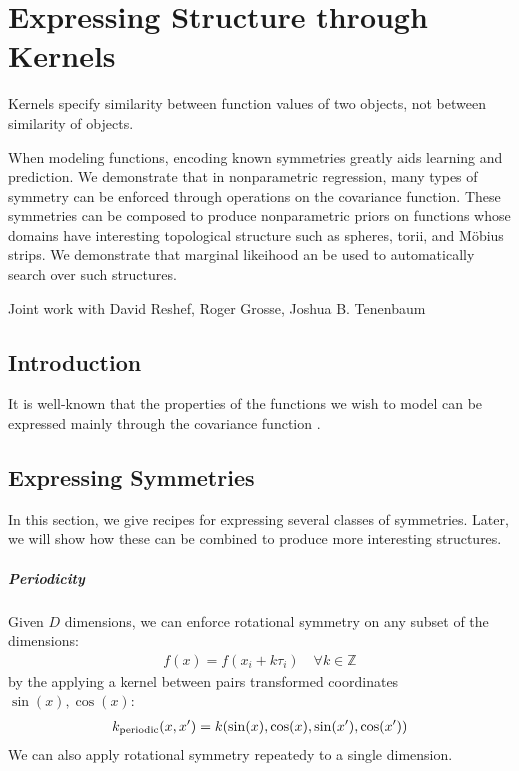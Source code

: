 
\inbpdocument

\chapter{Expressing Structure through Kernels}
\label{ch:kernels}


Kernels specify similarity between function values of two objects, not between similarity of objects.



When modeling functions, encoding known symmetries greatly aids learning and prediction.  We demonstrate that in nonparametric regression, many types of symmetry can be enforced through operations on the covariance function.  These symmetries can be composed to produce nonparametric priors on functions whose domains have interesting topological structure such as spheres, torii, and M\"{o}bius strips.  We demonstrate that marginal likeihood an be used to automatically search over such structures.

Joint work with David Reshef, Roger Grosse, Joshua B. Tenenbaum

\section{Introduction}


It is well-known that the properties of the functions we wish to model can be expressed mainly through the covariance function \cite{rasmussen38gaussian}.

\section{Expressing Symmetries}

In this section, we give recipes for expressing several classes of symmetries.  Later, we will show how these can be combined to produce more interesting structures.

\paragraph{Periodicity}
Given $D$ dimensions, we can enforce rotational symmetry on any subset of the dimensions:
%
\begin{align}
f(x) = f( x_i + k \tau_i) \quad \forall k \in \mathbb{Z}
\end{align}
%
by the applying a kernel between pairs transformed coordinates $\sin(x), \cos(x)$:
%
\begin{align}
k_{\textnormal{periodic}}(x, x') = k(\sin(x), \cos(x), \sin(x'), \cos(x'))
\end{align}
%
We can also apply rotational symmetry repeatedy to a single dimension.

